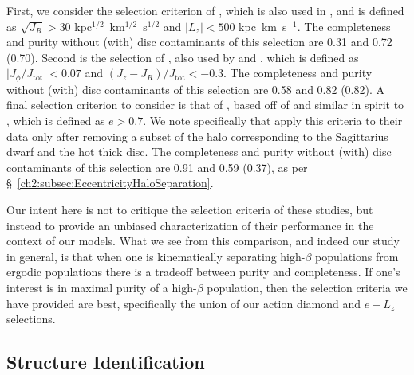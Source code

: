 First, we consider the selection criterion of \textcite{feuillet20}, which is also used in \textcite{matsuno21}, and is defined as $\sqrt{J_{R}} > 30$ kpc$^{1/2}$~km$^{1/2}$~s$^{1/2}$ and $\lvert L_{z} \rvert < 500$ kpc~km~s$^{-1}$. The completeness and purity without (with) disc contaminants of this selection are 0.31 and 0.72 (0.70). Second is the selection of \textcite{myeong19}, also used by \textcite{monty20} and \textcite{cordoni20}, which is defined as $\lvert J_{\phi}/J_\mathrm{tot} \rvert < 0.07$ and $(J_{z}-J_{R})/J_\mathrm{tot} < -0.3$. The completeness and purity without (with) disc contaminants of this selection are 0.58 and 0.82 (0.82). A final selection criterion to consider is that of \textcite{naidu20}, based off of \textcite{belokurov18} and similar in spirit to \textcite{mackereth20}, which is defined as $e>0.7$. We note specifically that \textcite{naidu20} apply this criteria to their data only after removing a subset of the halo corresponding to the Sagittarius dwarf and the hot thick disc. The completeness and purity without (with) disc contaminants of this selection are 0.91 and 0.59 (0.37), as per \S~\ref{ch2:subsec:EccentricityHaloSeparation}.

Our intent here is not to critique the selection criteria of these studies, but instead to provide an unbiased characterization of their performance in the context of our models. What we see from this comparison, and indeed our study in general, is that when one is kinematically separating high-$\beta$ populations from ergodic populations there is a tradeoff between purity and completeness. If one's interest is in maximal purity of a high-$\beta$ population, then the selection criteria we have provided are best, specifically the union of our action diamond and $e-L_{z}$ selections.

\subsection{Structure Identification}

